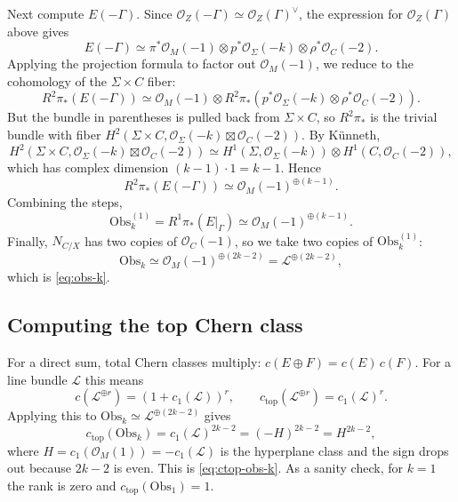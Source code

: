 \documentclass[12pt]{article}
\begin{document}
Next compute $E(-\Gamma)$. Since $\mathcal{O}_Z(-\Gamma)\simeq\mathcal{O}_Z(\Gamma)^\vee$,
the expression for $\mathcal{O}_Z(\Gamma)$ above gives
\begin{equation*}
  E(-\Gamma)\simeq
  \pi^*\mathcal{O}_M(-1)\otimes p^*\mathcal{O}_\Sigma(-k)\otimes \rho^*\mathcal{O}_C(-2).
\end{equation*}
Applying the projection formula to factor out $\mathcal{O}_M(-1)$, we reduce to
the cohomology of the $\Sigma\times C$ fiber:
\begin{equation*}
  R^2\pi_*(E(-\Gamma))
  \simeq
  \mathcal{O}_M(-1)\otimes R^2\pi_*\!\left(p^*\mathcal{O}_\Sigma(-k)\otimes \rho^*\mathcal{O}_C(-2)\right).
\end{equation*}
But the bundle in parentheses is pulled back from $\Sigma\times C$, so
$R^2\pi_*$ is the trivial bundle with fiber
$H^2(\Sigma\times C,\mathcal{O}_\Sigma(-k)\boxtimes\mathcal{O}_C(-2))$. By K\"unneth,
\begin{equation*}
  H^2(\Sigma\times C,\mathcal{O}_\Sigma(-k)\boxtimes\mathcal{O}_C(-2))
  \simeq
  H^1(\Sigma,\mathcal{O}_\Sigma(-k))\otimes H^1(C,\mathcal{O}_C(-2)),
\end{equation*}
which has complex dimension $(k-1)\cdot 1=k-1$. Hence
\begin{equation*}
  R^2\pi_*(E(-\Gamma))\simeq \mathcal{O}_M(-1)^{\oplus(k-1)}.
\end{equation*}
Combining the steps,
\begin{equation*}
  \mathrm{Obs}^{(1)}_k = R^1\pi_*(E|_\Gamma)\simeq \mathcal{O}_M(-1)^{\oplus(k-1)}.
\end{equation*}
Finally, $N_{C/X}$ has two copies of $\mathcal{O}_C(-1)$, so we take two copies
of $\mathrm{Obs}^{(1)}_k$:
\begin{equation*}
  \mathrm{Obs}_k \simeq \mathcal{O}_M(-1)^{\oplus(2k-2)}=\mathcal{L}^{\oplus(2k-2)},
\end{equation*}
which is \eqref{eq:obs-k}.

\subsection{Computing the top Chern class}
For a direct sum, total Chern classes multiply: $c(E\oplus F)=c(E)\,c(F)$. For a
line bundle $\mathcal{L}$ this means
\begin{equation*}
  c(\mathcal{L}^{\oplus r})=(1+c_1(\mathcal{L}))^r,
  \qquad
  c_{\mathrm{top}}(\mathcal{L}^{\oplus r})=c_1(\mathcal{L})^r.
\end{equation*}
Applying this to $\mathrm{Obs}_k\simeq\mathcal{L}^{\oplus(2k-2)}$ gives
\begin{equation*}
  c_{\mathrm{top}}(\mathrm{Obs}_k)=c_1(\mathcal{L})^{2k-2}=(-H)^{2k-2}=H^{2k-2},
\end{equation*}
where $H=c_1(\mathcal{O}_M(1))=-c_1(\mathcal{L})$ is the hyperplane class and
the sign drops out because $2k-2$ is even. This is \eqref{eq:ctop-obs-k}. As a
sanity check, for $k=1$ the rank is zero and $c_{\mathrm{top}}(\mathrm{Obs}_1)=1$.
\end{document}
